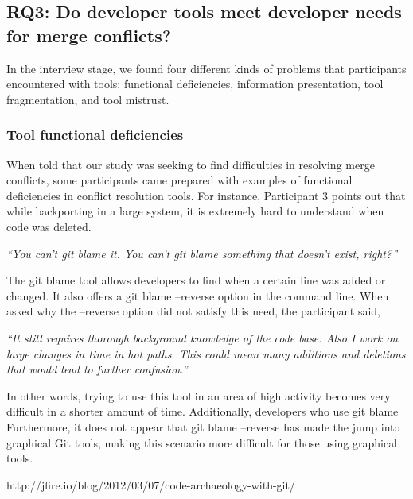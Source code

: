 \subsection{\textbf{RQ3:} Do developer tools meet developer needs for merge conflicts?}\label{RQ3}

In the interview stage, we found four different kinds of problems that participants encountered with tools: functional deficiencies, information presentation, tool fragmentation, and tool mistrust. 


\subsubsection{Tool functional deficiencies}
When told that our study was seeking to find difficulties in resolving merge conflicts, some participants came prepared with examples of functional deficiencies in conflict resolution tools. For instance, Participant 3 points out that while backporting in a large system, it is extremely hard to understand when code was deleted. 

\begin{displayquote}
\textit{``You can't git blame it. You can't git blame something that doesn't exist, right?''}
\end{displayquote}

The git blame tool allows developers to find when a certain line was added or changed. It also offers a git blame --reverse option in the command line. When asked why the --reverse option did not satisfy this need, the participant said, 

\begin{displayquote}
\textit{``It still requires thorough background knowledge of the code base. Also I work on large changes in time in hot paths. This could mean many additions and deletions that would lead to further confusion.''}
\end{displayquote}

 In other words, trying to use this tool in an area of high activity becomes very difficult in a shorter amount of time. Additionally, developers who use git blame Furthermore, it does not appear that git blame --reverse has made the jump into graphical Git tools, making this scenario more difficult for those using graphical tools.


http://jfire.io/blog/2012/03/07/code-archaeology-with-git/

